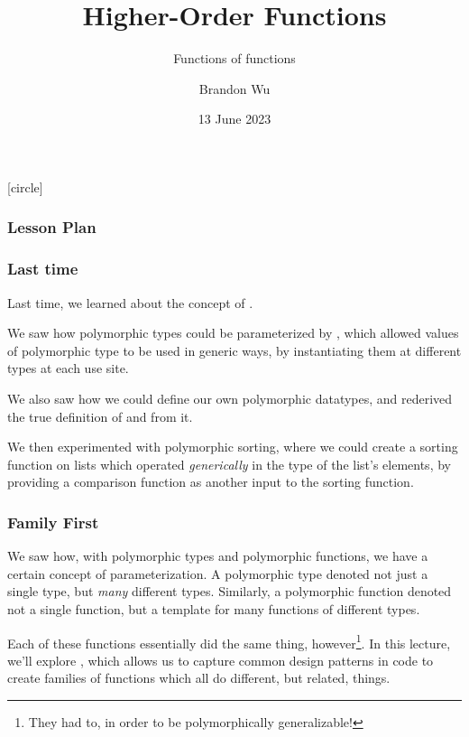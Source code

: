 \documentclass[aspectratio=169, handout]{beamer}
\title{Higher-Order Functions} %
\subtitle{Functions of functions} %
\date{13 June 2023} %
\author{Brandon Wu} %
\newif\ifcolorlambda
\begin{document}
\ifweb
    \renewcommand{\pause}{}
\fi

[circle]

{
\begin{frame}[plain]
    \colorlambdatrue
    \titlepage
\end{frame}
}


\begin{frame}[fragile]
  \frametitle{Lesson Plan}

  \tableofcontents
\end{frame}

\begin{frame}[fragile]
  \frametitle{Last time}

  Last time, we learned about the concept of .

  \pause
  \vspace{\fill}

  We saw how polymorphic types could be parameterized by , which
  allowed values of polymorphic type to be used in generic ways, by instantiating them
  at different types at each use site.

  \pause
  \vspace{\fill}

  We also saw how we could define our own polymorphic datatypes, and rederived the true
  definition of  and  from it.

  \pause
  \vspace{\fill}

  We then experimented with polymorphic sorting, where we could create a sorting function
  on lists which operated \textit{generically} in the type of the list's elements, by providing
  a comparison function as another input to the sorting function.
\end{frame}


\begin{frame}[fragile]
  \frametitle{Family First}

  We saw how, with polymorphic types and polymorphic functions, we have a certain concept
  of parameterization. A polymorphic type denoted not just a single type, but
  \textit{many} different types. Similarly, a polymorphic function denoted not a single
  function, but a template for many functions of different types.

  \pause
  \vspace{\fill}

  Each of these functions essentially did the same thing, however\footnote{They
  had to, in order to be polymorphically generalizable!}. In this lecture, we'll
  explore , which allows us to capture common
  design patterns in code to create families of functions which all do
  different, but related, things.
\end{frame}
\end{document}
